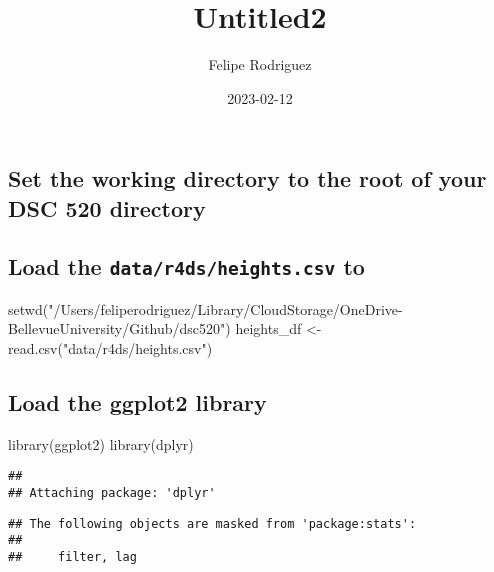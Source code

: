 \documentclass[
]{article}
\title{Untitled2}
\author{Felipe Rodriguez}
\date{2023-02-12}
\newenvironment{Shaded}{\begin{snugshade}}{\end{snugshade}}
\newcommand{\FunctionTok}[1]{\textcolor[rgb]{0.00,0.00,0.00}{#1}}
\newcommand{\NormalTok}[1]{#1}
\newcommand{\OtherTok}[1]{\textcolor[rgb]{0.56,0.35,0.01}{#1}}
\newcommand{\StringTok}[1]{\textcolor[rgb]{0.31,0.60,0.02}{#1}}
\begin{document}
\maketitle

\hypertarget{set-the-working-directory-to-the-root-of-your-dsc-520-directory}{%
\subsection{Set the working directory to the root of your DSC 520
directory}\label{set-the-working-directory-to-the-root-of-your-dsc-520-directory}}

\hypertarget{load-the-datar4dsheights.csv-to}{%
\subsection{\texorpdfstring{Load the \texttt{data/r4ds/heights.csv}
to}{Load the data/r4ds/heights.csv to}}\label{load-the-datar4dsheights.csv-to}}

\begin{Shaded}
\begin{Highlighting}[]
\FunctionTok{setwd}\NormalTok{(}\StringTok{"/Users/feliperodriguez/Library/CloudStorage/OneDrive{-}BellevueUniversity/Github/dsc520"}\NormalTok{)}
\NormalTok{heights\_df }\OtherTok{\textless{}{-}} \FunctionTok{read.csv}\NormalTok{(}\StringTok{"data/r4ds/heights.csv"}\NormalTok{)}
\end{Highlighting}
\end{Shaded}

\hypertarget{load-the-ggplot2-library}{%
\subsection{Load the ggplot2 library}\label{load-the-ggplot2-library}}

\begin{Shaded}
\begin{Highlighting}[]
\FunctionTok{library}\NormalTok{(ggplot2)}
\FunctionTok{library}\NormalTok{(dplyr)}
\end{Highlighting}
\end{Shaded}

\begin{verbatim}
## 
## Attaching package: 'dplyr'
\end{verbatim}

\begin{verbatim}
## The following objects are masked from 'package:stats':
## 
##     filter, lag
\end{verbatim}
\end{document}
